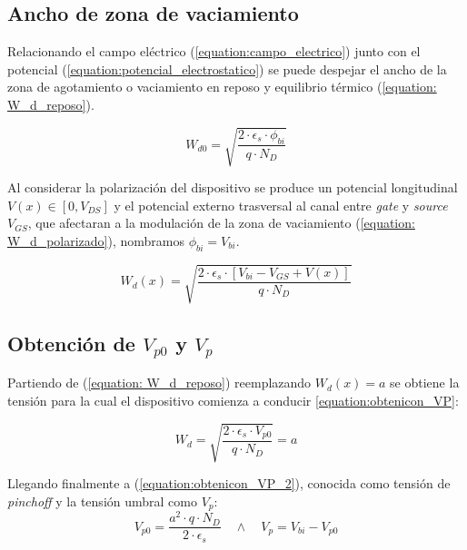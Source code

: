 \documentclass[a4paper]{article}
\begin{document}
\subsection{Ancho de zona de vaciamiento}

Relacionando el campo eléctrico (\ref{equation:campo_electrico}) junto con el potencial (\ref{equation:potencial_electrostatico}) se puede despejar el ancho de la zona de agotamiento o vaciamiento en reposo y equilibrio térmico (\ref{equation: W_d_reposo}).

\begin{equation}\label{equation: W_d_reposo}
	W_{d0} = \sqrt{\frac{2 \cdot \epsilon_s \cdot \phi_{bi}}{q\cdot N_D}}
\end{equation} 


Al considerar la polarización del dispositivo se produce un potencial longitudinal $V(x) \in [0 ,V_{DS}]$ y el potencial externo trasversal al canal entre \textit{gate} y \textit{source} $V_{GS}$, que afectaran a la modulación de la zona de vaciamiento (\ref{equation: W_d_polarizado}), nombramos $ \phi_{bi} = V_{bi}$.

\begin{equation}\label{equation: W_d_polarizado}
	W_d(x) = \sqrt{\frac{2 \cdot \epsilon_s \cdot [  V_{bi} - V_{GS} + V(x)] }{q\cdot N_D}}
\end{equation} 

\subsection{Obtención de $V_{p0}$ y $V_{p}$}

Partiendo de (\ref{equation: W_d_reposo}) reemplazando $W_d(x) = a $ se obtiene la tensión para la cual el dispositivo comienza a conducir \ref{equation:obtenicon_VP}: 

\begin{equation}\label{equation:obtenicon_VP}
	W_d = \sqrt{\frac{2 \cdot \epsilon_s \cdot V_{p0} }{q\cdot N_D}} = a 
\end{equation} 

Llegando finalmente a (\ref{equation:obtenicon_VP_2}), conocida como tensión de \textit{pinchoff} y la tensión umbral como $V_{p}$:
\begin{equation}\label{equation:obtenicon_VP_2}
		 V_{p0} = \frac{a^2 \cdot q\cdot N_D}{2 \cdot \epsilon_s } \quad \wedge \quad 	V_{p} = V_{bi} - V_{p0}  
\end{equation}
\end{document}

